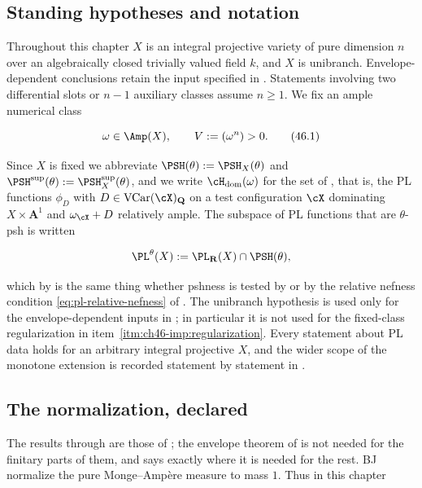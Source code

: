 \subsection{Standing hypotheses and notation}
\label{sec:ch46-hypotheses}

Throughout this chapter $X$ is an integral projective variety of pure
dimension $n$ over an algebraically closed trivially valued field $k$,
and $X$ is unibranch. Envelope-dependent conclusions retain the input
specified in . Statements involving two differential slots or
$n-1$ auxiliary classes assume $n\ge1$. We fix an ample numerical class

\[
                    \omega\in\Amp(X),\qquad V:=(\omega^n)>0.
\tag{46.1}\label{eq:bj-volume}
\]

Since $X$ is fixed we abbreviate $\PSH(\theta):=\PSH_X(\theta)$ and
$\PSH^{\sup}(\theta):=\PSH^{\sup}_X(\theta)$, and we write
$\cH_{\mathrm{dom}}(\omega)$ for the set of , that is,
the PL functions $\phi_D$ with $D\in\operatorname{VCar}(\cX)_{\mathbf Q}$
on a test configuration $\cX$ dominating $X\times\mathbf A^1$ and
$\omega_{\cX}+D$ relatively ample.  The subspace of PL functions that are
$\theta$-psh is written

\[
 \PL^{\theta}(X):=\PL_{\mathbf R}(X)\cap\PSH(\theta),
\]

which by  is the same thing whether pshness
is tested by  or by the relative nefness condition
\eqref{eq:pl-relative-nefness} of .  The
unibranch hypothesis is used only for the envelope-dependent inputs in
; in particular it is not used for the
fixed-class regularization in item~\cref{itm:ch46-imp:regularization}.
Every statement about PL data holds for an arbitrary integral projective
$X$, and the wider scope of the monotone extension is recorded statement
by statement in .

\subsection{The normalization, declared}
\label{sec:ch46-normalization}

The results through  are those of
\cite[Sections~3 and 7]{BJ22}; the envelope theorem of
 is
not needed for the finitary parts of them, and
 says exactly where it is needed for the
rest.  BJ normalize the pure Monge--Amp\`ere measure to
mass $1$.  Thus in this chapter


